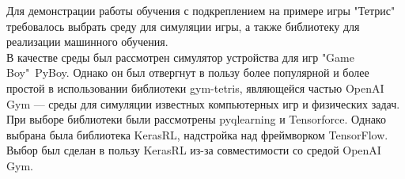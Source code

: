 \documentclass{article}
\begin{document}
Для демонстрации работы обучения с подкреплением на примере игры "Тетрис" требовалось выбрать среду для симуляции игры, а также библиотеку для реализации машинного обучения.\\
В качестве среды был рассмотрен симулятор устройства для игр "Game Boy"\ PyBoy\cite{litlink3}. Однако он был отвергнут в пользу более популярной и более простой в использовании библиотеки gym-tetris\cite{litlink5}, являющейся частью OpenAI Gym\cite{litlink14} — среды для симуляции известных компьютерных игр и физических задач.\\
При выборе библиотеки были рассмотрены pyqlearning\cite{litlink1} и Tensorforce\cite{litlink17}. Однако выбрана была библиотека KerasRL\cite{litlink9}, надстройка над фреймворком TensorFlow\cite{litlink16}. Выбор был сделан в пользу KerasRL из-за совместимости со средой OpenAI Gym.
\newpage
\end{document}
